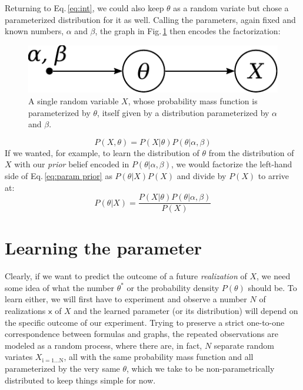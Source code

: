 \documentclass[]{report}
\begin{document}
Returning to Eq.\,\ref{eq:int}, we could also keep $\theta$ as a random variate but chose a parameterized distribution for it as well. Calling the parameters, again fixed and known numbers, $\alpha$ and $\beta$, the graph in Fig.\,\ref{fig:1var1param2const} then encodes the factorization:
\begin{figure}[h]
	\centering
	\includegraphics[scale=0.5]{1var_1param_2const}
	\caption{A single random variable $X$, whose probability mass function is parameterized by $\theta$, itself given by a distribution parameterized by $\alpha$ and $\beta$.}
	\label{fig:1var1param2const}
\end{figure}
\begin{equation} \label{eq:param prior}
P(X, \theta) = P(X|\theta)P(\theta|\alpha, \beta)
\end{equation}
If we wanted, for example, to learn the distribution of $\theta$ from the distribution of $X$ with our \emph{prior} belief encoded in $P(\theta|\alpha, \beta)$, we would factorize the left-hand side of Eq.\,\ref{eq:param prior} as $P(\theta|X)P(X)$ and divide by $P(X)$ to arrive at:
\begin{equation} \label{eq:bayes}
P(\theta|X) = \frac{P(X|\theta)P(\theta|\alpha, \beta)}{P(X)}
\end{equation}

\section{Learning the parameter} \label{sect:learn_param}
Clearly, if we want to predict the outcome of a future \emph{realization} of $X$, we need some idea of what the number $\theta^*$ or the probability density $P(\theta)$ should be. To learn either, we will first have to experiment and observe a number $N$ of realizations $\mathsf{x}$ of $X$ and the learned parameter (or its distribution) will depend on the specific outcome of our experiment. Trying to preserve a strict one-to-one correspondence between formulas and graphs, the repeated observations are modeled as a random process, where there are, in fact, $N$ separate random variates $X_\mathrm{i=1 \ldots N}$, all with the same probability mass function and all parameterized by the very same $\theta$, which we take to be non-parametrically distributed to keep things simple for now.
\end{document}
